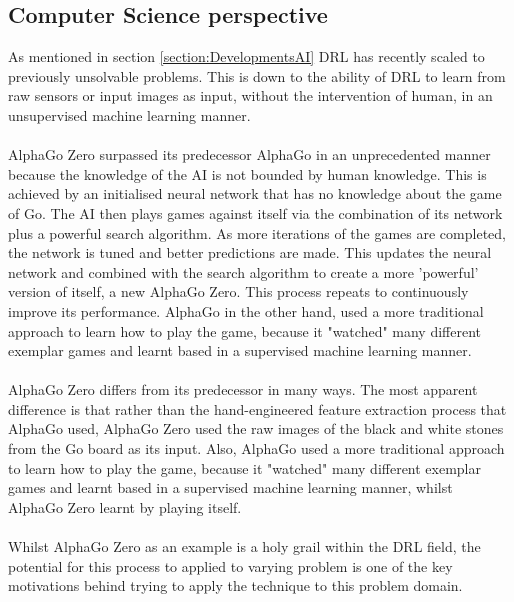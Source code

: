 \documentclass[ %
                    author={Ashwinder Khurana},
                supervisor={Prof Dave Cliff},
                    degree={MEng},
                     title={The Deeply Reinforced Trader},
                  subtitle={},
                      type={enterprise},
                      year={2020} ]{dissertation}
\begin{document}
\subsection{Computer Science perspective}
\vspace{0.5cm} 
As mentioned in section \ref{section:DevelopmentsAI} DRL has recently scaled to previously unsolvable problems. This is down to the ability of DRL to learn from raw sensors or input images as input, without the intervention of human, in an unsupervised machine learning manner. 
\\
\\
AlphaGo Zero surpassed its predecessor AlphaGo in an unprecedented manner because the knowledge of the AI is not bounded by human knowledge\cite{deepmind alpha go zero}. This is achieved by an initialised neural network that has no knowledge about the game of Go. The AI then plays games against itself via the combination of its network plus a powerful search algorithm. As more iterations of the games are completed, the network is tuned and better predictions are made. This updates the neural network and combined with the search algorithm to create a more 'powerful' version of itself, a new AlphaGo Zero. This process repeats to continuously improve its performance.
AlphaGo in the other hand, used a more traditional approach to learn how to play the game, because it "watched" many different exemplar games and learnt based in a supervised machine learning manner.
\\
\\
AlphaGo Zero differs from its predecessor in many ways. The most apparent difference is that rather than the hand-engineered feature extraction process that AlphaGo used, AlphaGo Zero used the raw images of the black and white stones from the Go board as its input. Also, AlphaGo used a more traditional approach to learn how to play the game, because it "watched" many different exemplar games and learnt based in a supervised machine learning manner, whilst AlphaGo Zero learnt by playing itself.
\\
\\
Whilst AlphaGo Zero as an example is a holy grail within the DRL field, the potential for this process to applied to varying problem is one of the key motivations behind trying to apply the technique to this problem domain.

\vspace{0.5cm}
\end{document}
